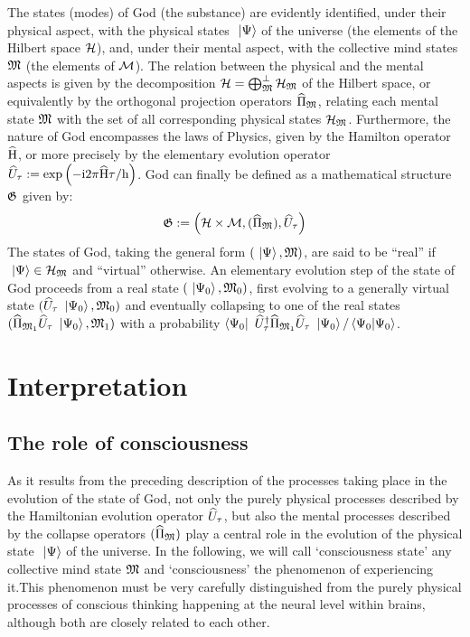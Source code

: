 \documentclass[10pt,a4paper,twoside,openany]{book}
\begin{document}
The states (modes) of God (the substance) are evidently identified, under their physical aspect, with the physical states $\ \left|{\Psi}\right\rangle$ of the universe (the elements of the Hilbert space $\mathcal H$), and, under their mental aspect, with the collective mind states $\mathfrak{M}$ (the elements of $\mathcal M$). The relation between the physical and the mental aspects is given by the decomposition $\mathcal H = \bigoplus_{\mathfrak{M}}^\perp \mathcal H_{\mathfrak{M}}$ of the Hilbert space, or equivalently by the orthogonal projection operators $\widehat{\Pi}_{\mathfrak{M}}$, relating each mental state $\mathfrak{M}$ with the set of all corresponding physical states $\mathcal H_{\mathfrak{M}}$. Furthermore, the nature of God encompasses the laws of Physics, given by the Hamilton operator $\widehat{\mathrm H}$, or more precisely by the elementary evolution operator $\widehat{U}_\tau := \mathrm{exp} \left( {- \mathrm{i} 2 \pi \widehat{\mathrm H} \tau / \mathrm h} \right)$. God can finally be defined as a mathematical structure $\mathfrak{G}$ given by:
\begin{equation*}
\mathfrak{G} := \left( \mathcal H \times \mathcal M, (\widehat{\Pi}_{\mathfrak{M}}), \widehat{U}_\tau \right)
\end{equation*}
The states of God, taking the general form $(\ \left|{\Psi}\right\rangle, \mathfrak{M})$, are said to be ``real'' if $\ \left|{\Psi}\right\rangle \in \mathcal H_{\mathfrak{M}}$ and ``virtual'' otherwise. An elementary evolution step of the state of God proceeds from a real state $(\ \left|{\Psi_0}\right\rangle, \mathfrak{M}_0)$, first evolving to a generally virtual state $(\widehat{U}_\tau \ \left|{\Psi_0}\right\rangle, \mathfrak{M}_0)$ and eventually collapsing to one of the real states $(\widehat{\Pi}_{\mathfrak{M}_1} \widehat{U}_\tau \ \left|{\Psi_0}\right\rangle, \mathfrak{M}_1)$ with a probability $\left\langle{\Psi_0}\right|\  \widehat{U}^{\dagger}_\tau \widehat{\Pi}_{\mathfrak{M}_1} \widehat{U}_\tau \ \left|{\Psi_0}\right\rangle / \left\langle{\Psi_0}|{\Psi_0}\right\rangle$.

\chapter{Interpretation}
\label{Interpretation}

\section{The role of consciousness}

As it results from the preceding description of the processes taking place in the evolution of the state of God, not only the purely physical processes described by the Hamiltonian evolution operator $\widehat{U}_\tau$, but also the mental processes described by the collapse operators $(\widehat{\Pi}_{\mathfrak{M}})$ play a central role in the evolution of the physical state $\ \left|{\Psi}\right\rangle$ of the universe. In the following, we will call `consciousness state' any collective mind state $\mathfrak{M}$ and `consciousness' the phenomenon of experiencing it.This phenomenon must be very carefully distinguished from the purely physical processes of conscious thinking happening at the neural level within brains, although both are closely related to each other.
\end{document}
